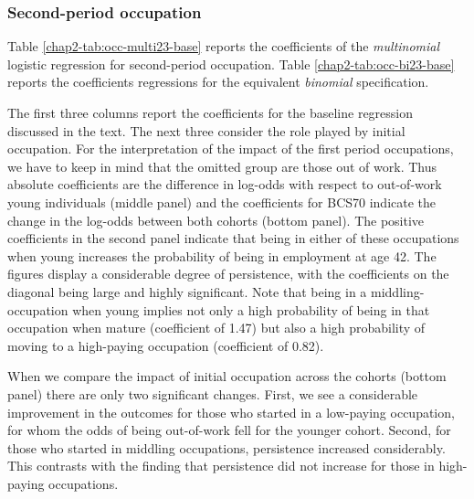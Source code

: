\subsubsection{Second-period occupation}

Table \ref{chap2-tab:occ-multi23-base} reports the coefficients of the \emph{multinomial} logistic regression for second-period occupation. Table \ref{chap2-tab:occ-bi23-base} reports the coefficients regressions for the equivalent \emph{binomial} specification.

The first three columns report the coefficients for the baseline regression discussed in the text. The next three consider the role played by initial occupation. For the interpretation of the impact of the first period occupations, we have to keep in mind that the omitted group are those out of work. Thus absolute coefficients are the difference in log-odds with respect to out-of-work young individuals (middle panel) and the coefficients for BCS70 indicate the change in the log-odds between both cohorts (bottom panel). The positive coefficients in the second panel indicate that being in either of these occupations when young increases the probability of being in employment at age 42. The figures display a considerable degree of persistence, with the coefficients on the diagonal being large and highly significant. Note that being in a middling-occupation when young implies not only a high probability of being in that occupation when mature (coefficient of 1.47) but also a high probability of moving to a high-paying occupation (coefficient of 0.82). 

When we compare the impact of initial occupation across the cohorts (bottom panel) there are only two significant changes. First, we see a considerable improvement in the outcomes for those who started in a low-paying occupation, for whom the odds of being out-of-work fell for the younger cohort. Second, for those who started in middling occupations, persistence increased considerably. This contrasts with the finding that persistence did not increase for those in high-paying occupations. 


